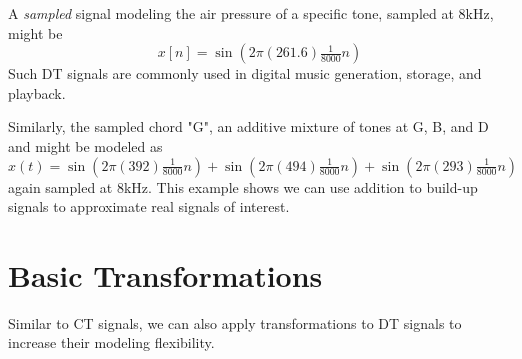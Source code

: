 \begin{example}
  A \emph{sampled} signal modeling the air pressure of a specific tone, sampled at 8kHz, might be 
  \[
  x[n] = \sin\left(2\pi (261.6) \tfrac{1}{8000} n\right)
  \]
  Such DT signals are commonly used in digital music generation, storage, and playback.
\end{example}
\begin{example}
    Similarly, the sampled chord "G", an additive mixture of tones at G, B, and D and might be modeled as
    \[
    x(t) = \sin\left(2\pi (392) \tfrac{1}{8000} n\right) + \sin\left(2\pi (494) \tfrac{1}{8000} n\right) + \sin\left(2\pi (293) \tfrac{1}{8000} n\right) 
    \]
    again sampled at 8kHz. This example shows we can use addition to build-up signals to approximate real signals of interest.
\end{example}

\section{Basic Transformations}

Similar to CT signals, we can also apply transformations to DT signals to increase their modeling flexibility.

